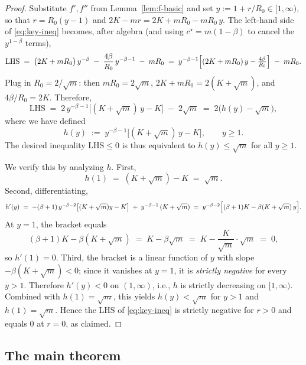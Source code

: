 \documentclass[11pt]{article}
\theoremstyle{definition}
\begin{document}
\begin{proof}
Substitute $f', f''$ from Lemma~\ref{lem:f-basic} and set $y := 1 + r/R_0 \in [1,\infty)$, so that $r = R_0(y - 1)$ and $2K - m r = 2K + m R_0 - m R_0\, y$. The left-hand side of \eqref{eq:key-ineq} becomes, after algebra (and using $c^\star = m(1-\beta)$ to cancel the $y^{1-\beta}$ terms),
\[
\text{LHS} \;=\; \bigl(2K + mR_0\bigr)\, y^{-\beta} \;-\; \frac{4\beta}{R_0}\, y^{-\beta-1} \;-\; m R_0
\;=\; y^{-\beta-1}\Bigl[(2K + m R_0)\, y - \tfrac{4\beta}{R_0}\Bigr] \;-\; m R_0.
\]
Plug in $R_0 = 2/\sqrt m$: then $m R_0 = 2\sqrt m$, $2K + m R_0 = 2(K + \sqrt m)$, and $4\beta/R_0 = 2 K$. Therefore,
\[
\text{LHS} \;=\; 2\,y^{-\beta-1}\bigl[(K + \sqrt m)\,y - K\bigr] \;-\; 2\sqrt m \;=\; 2\bigl(h(y) - \sqrt m\bigr),
\]
where we have defined
\begin{equation}\label{eq:hdef}
h(y) \;:=\; y^{-\beta-1}\bigl[(K + \sqrt m)\,y - K\bigr], \qquad y \ge 1.
\end{equation}
The desired inequality $\text{LHS} \le 0$ is thus equivalent to $h(y) \le \sqrt m$ for all $y \ge 1$.

We verify this by analyzing $h$. First,
\[
h(1) \;=\; (K + \sqrt m) - K \;=\; \sqrt m.
\]
Second, differentiating,
\[
h'(y) \;=\; -(\beta + 1)\,y^{-\beta-2}\bigl[(K+\sqrt m)y - K\bigr] \;+\; y^{-\beta-1}\,(K+\sqrt m)
\;=\; y^{-\beta-2}\Bigl[(\beta+1)K - \beta(K + \sqrt m)\,y\Bigr].
\]
At $y = 1$, the bracket equals
\[
(\beta+1)K - \beta(K + \sqrt m) \;=\; K - \beta\sqrt m \;=\; K - \frac{K}{\sqrt m}\cdot \sqrt m \;=\; 0,
\]
so $h'(1) = 0$. Third, the bracket is a linear function of $y$ with slope $-\beta(K+\sqrt m) < 0$; since it vanishes at $y = 1$, it is \emph{strictly negative} for every $y > 1$. Therefore $h'(y) < 0$ on $(1,\infty)$, i.e., $h$ is strictly decreasing on $[1,\infty)$. Combined with $h(1) = \sqrt m$, this yields $h(y) < \sqrt m$ for $y > 1$ and $h(1) = \sqrt m$. Hence the LHS of \eqref{eq:key-ineq} is strictly negative for $r > 0$ and equals $0$ at $r = 0$, as claimed.
\end{proof}

\subsection{The main theorem}
\end{document}

